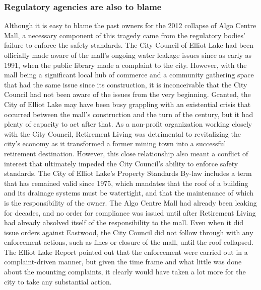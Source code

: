 \documentclass[12pt]{article}
\begin{document}
\subsubsection{Regulatory agencies are also to blame}

Although it is easy to blame the past owners for the 2012 collapse of Algo Centre Mall, a necessary component of this tragedy came from the regulatory bodies' failure to enforce the safety standards. The City Council of Elliot Lake had been officially made aware of the mall's ongoing water leakage issues since as early as 1991, when the public library made a complaint to the city. However, with the mall being a significant local hub of commerce and a community gathering space that had the same issue since its construction, it is inconceivable that the City Council had not been aware of the issues from the very beginning. Granted, the City of Elliot Lake may have been busy grappling with an existential crisis that occurred between the mall's construction and the turn of the century, but it had plenty of capacity to act after that. As a non-profit organization working closely with the City Council, Retirement Living was detrimental to revitalizing the city's economy as it transformed a former mining town into a successful retirement destination. However, this close relationship also meant a conflict of interest that ultimately impeded the City Council's ability to enforce safety standards. The City of Elliot Lake's Property Standards By-law includes a term that has remained valid since 1975, which mandates that the roof of a building and its drainage systems must be watertight, and that the maintenance of which is the responsibility of the owner. The Algo Centre Mall had already been leaking for decades, and no order for compliance was issued until after Retirement Living had already absolved itself of the responsibility to the mall. Even when it did issue orders against Eastwood, the City Council did not follow through with any enforcement actions, such as fines or closure of the mall, until the roof collapsed. The Elliot Lake Report pointed out that the enforcement were carried out in a complaint-driven manner, but given the time frame and what little was done about the mounting complaints, it clearly would have taken a lot more for the city to take any substantial action. 
\end{document}
